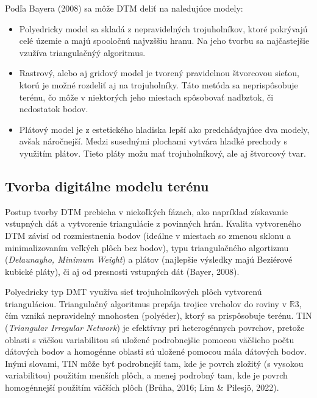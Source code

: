 \documentclass[12pt]{article}
\begin{document}
\par
Podľa Bayera (2008) sa môže DTM deliť na naledujúce modely:
\begin{itemize}
    \item Polyedricky model sa skladá z nepravidelných trojuholníkov, ktoré pokrývajú celé územie a majú spooločnú najvzššiu hranu. Na jeho tvorbu sa najčastejšie vzužíva triangulačnýý algoritmus.
    \item Rastrový, alebo aj gridový model je tvorený pravidelnou štvorcovou sieťou, ktorú je možné rozdeliť aj na trojuholníky. Táto metóda sa neprispôsobuje terénu, čo môže v niektorých jeho miestach spôsobovať nadbztok, či nedostatok bodov. 
    \item  Plátový model je z estetického hladiska lepší ako predchádyajúce dva modely, avšak náročnejší. Medzi susednými plochami vytvára hladké prechody s využitím  plátov. Tieto pláty možu mať trojuholníkový, ale aj štvorcový tvar.
\end{itemize} \par

\subsection*{Tvorba digitálne modelu terénu}
Postup tvorby DTM prebieha v niekoľkých fázach, ako napríklad získavanie vstupných dát a vytvorenie triangulácie z povinných hrán. Kvalita vytvoreného DTM závisí od rozmiestnenia bodov (ideálne v miestach so zmenou sklonu a minimalizovaním veľkých plôch bez bodov), typu triangulačného algortizmu (\textit{Delaunayho, Minimum Weight}) a plátov (najlepšie výsledky majú Beziérové kubické pláty), či aj od presnosti vstupných dát (Bayer, 2008). \par
Polyedricky typ DMT využíva sieť trojuholníkových plôch vytvorenú trianguláciou. Triangulačný algoritmus prepája trojice vrcholov do roviny v $\mathbb{R}$3, čím vzniká nepravidelný mnohosten (polyéder), ktorý sa prispôsobuje terénu. TIN (\textit{Triangular Irregular Network}) je efektívny pri heterogénnych povrchov, pretože oblasti s väčšou variabilitou sú uložené podrobnejšie pomocou väčšieho počtu dátových bodov a homogénne oblasti sú uložené pomocou mála dátových bodov. Inými slovami, TIN môže byť podrobnejší tam, kde je povrch zložitý (s vysokou variabilitou) použitím menších plôch, a menej podrobný tam, kde je povrch homogénnejší použitím väčších plôch (Brůha, 2016; Lim \& Pilesjö, 2022). 
\end{document}
